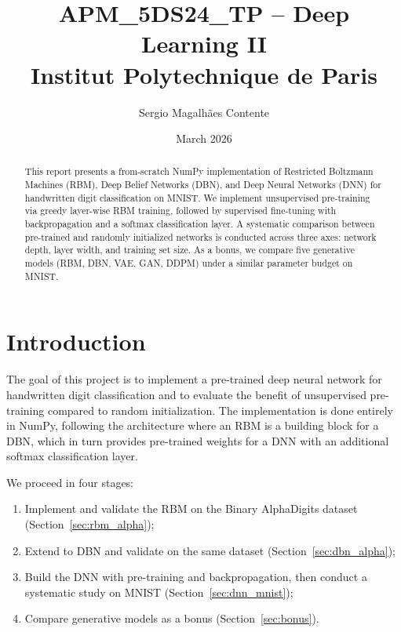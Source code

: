 \documentclass[11pt,a4paper]{article}
\title{\textbf{APM\_5DS24\_TP -- Deep Learning II}\\[0.3cm]
\large Institut Polytechnique de Paris}
\author{Sergio Magalh\~{a}es Contente}
\date{March 2026}
\begin{document}
\maketitle

\begin{abstract}
This report presents a from-scratch NumPy implementation of Restricted Boltzmann Machines (RBM), Deep Belief Networks (DBN), and Deep Neural Networks (DNN) for handwritten digit classification on MNIST.
We implement unsupervised pre-training via greedy layer-wise RBM training, followed by supervised fine-tuning with backpropagation and a softmax classification layer.
A systematic comparison between pre-trained and randomly initialized networks is conducted across three axes: network depth, layer width, and training set size.
As a bonus, we compare five generative models (RBM, DBN, VAE, GAN, DDPM) under a similar parameter budget on MNIST.
\end{abstract}

\newpage
\tableofcontents
\newpage

\section{Introduction}

The goal of this project is to implement a pre-trained deep neural network for handwritten digit classification and to evaluate the benefit of unsupervised pre-training compared to random initialization.
The implementation is done entirely in NumPy, following the architecture where an RBM is a building block for a DBN, which in turn provides pre-trained weights for a DNN with an additional softmax classification layer.

We proceed in four stages:
\begin{enumerate}
    \item Implement and validate the RBM on the Binary AlphaDigits dataset (Section~\ref{sec:rbm_alpha});
    \item Extend to DBN and validate on the same dataset (Section~\ref{sec:dbn_alpha});
    \item Build the DNN with pre-training and backpropagation, then conduct a systematic study on MNIST (Section~\ref{sec:dnn_mnist});
    \item Compare generative models as a bonus (Section~\ref{sec:bonus}).
\end{enumerate}
\end{document}
